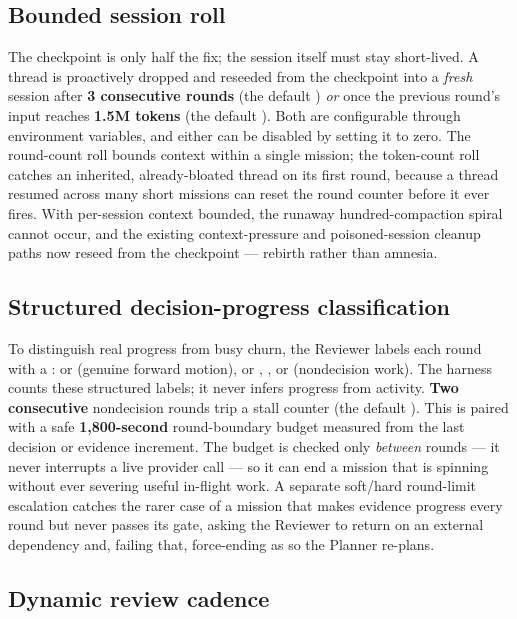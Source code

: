 \subsection{Bounded session roll}

The checkpoint is only half the fix; the session itself must stay short-lived. A
thread is proactively dropped and reseeded from the checkpoint into a
\emph{fresh} session after \textbf{3 consecutive rounds} (the default
) \emph{or} once the previous round's input reaches
\textbf{1.5M tokens} (the default ). Both are
configurable through environment variables, and either can be disabled by setting
it to zero. The round-count roll bounds context within a single mission; the
token-count roll catches an inherited, already-bloated thread on its first round,
because a thread resumed across many short missions can reset the round counter
before it ever fires. With per-session context bounded, the runaway
hundred-compaction spiral cannot occur, and the existing context-pressure and
poisoned-session cleanup paths now reseed from the checkpoint --- rebirth rather
than amnesia.

\subsection{Structured decision-progress classification}

To distinguish real progress from busy churn, the Reviewer labels each round with
a :  or  (genuine forward
motion), or , , or 
(nondecision work). The harness counts these structured labels; it never infers
progress from activity. \textbf{Two consecutive} nondecision rounds trip a stall
counter (the default ). This is paired with a safe
\textbf{1{,}800-second} round-boundary budget measured from the last decision or
evidence increment. The budget is checked only \emph{between} rounds --- it never
interrupts a live provider call --- so it can end a mission that is spinning
without ever severing useful in-flight work. A separate soft/hard round-limit
escalation catches the rarer case of a mission that makes evidence progress every
round but never passes its gate, asking the Reviewer to return  on an
external dependency and, failing that, force-ending as  so the
Planner re-plans.

\subsection{Dynamic review cadence}

